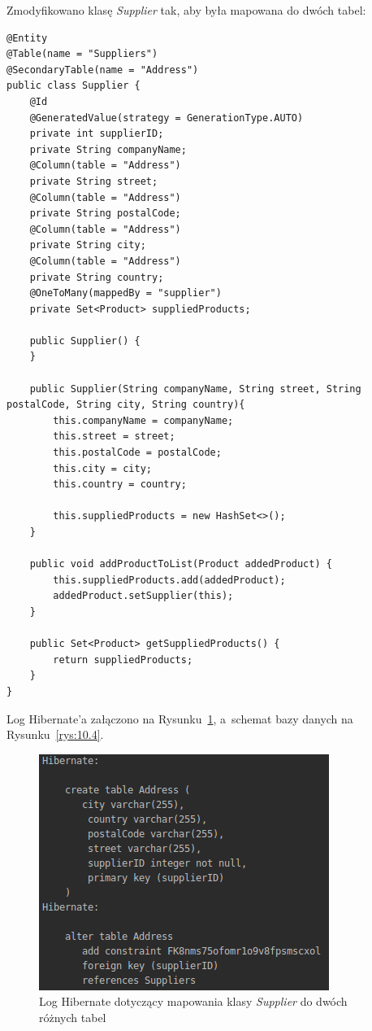 \documentclass[12pt, a4paper]{mwart}
\begin{document}
\newpage
Zmodyfikowano klasę \textit{Supplier} tak, aby była mapowana do dwóch tabel:
\begin{lstlisting}
@Entity
@Table(name = "Suppliers")
@SecondaryTable(name = "Address")
public class Supplier {
    @Id
    @GeneratedValue(strategy = GenerationType.AUTO)
    private int supplierID;
    private String companyName;
    @Column(table = "Address")
    private String street;
    @Column(table = "Address")
    private String postalCode;
    @Column(table = "Address")
    private String city;
    @Column(table = "Address")
    private String country;
    @OneToMany(mappedBy = "supplier")
    private Set<Product> suppliedProducts;

    public Supplier() {
    }

    public Supplier(String companyName, String street, String postalCode, String city, String country){
        this.companyName = companyName;
        this.street = street;
        this.postalCode = postalCode;
        this.city = city;
        this.country = country;

        this.suppliedProducts = new HashSet<>();
    }

    public void addProductToList(Product addedProduct) {
        this.suppliedProducts.add(addedProduct);
        addedProduct.setSupplier(this);
    }

    public Set<Product> getSuppliedProducts() {
        return suppliedProducts;
    }
}
\end{lstlisting}

Log Hibernate'a załączono na Rysunku~\ref{rys:10.3}, a~schemat bazy danych na Rysunku~\ref{rys:10.4}.

\begin{figure}[ht]
  \centering
  \includegraphics[scale=0.5]{X/10-3.png}
  \caption{Log Hibernate dotyczący mapowania klasy \textit{Supplier} do dwóch różnych tabel}
  \label{rys:10.3}
\end{figure}
\end{document}
